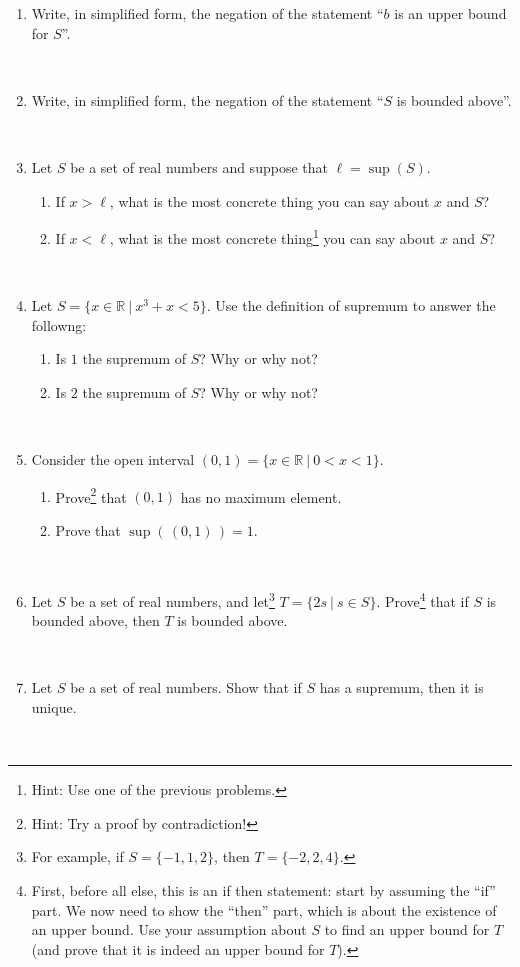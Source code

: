 \documentclass[12pt]{amsart}
\newcommand{\R}{\mathbb{R}}
\begin{document}
\begin{enumerate}
\item Write, in simplified form, the negation of the statement ``$b$ is an upper bound for $S$''.

\

\item\label{2} Write, in simplified form, the negation of the statement ``$S$ is bounded above''.

\

\item Let $S$ be a set of real numbers and suppose that $\ell=\sup(S)$. 
\begin{enumerate}
\item If $x > \ell$, what is the most concrete thing you can say about $x$ and $S$?
\item If $x < \ell$, what is the most concrete thing\footnote{Hint: Use one of the previous problems.} you can say about $x$ and $S$?
\end{enumerate}

\

\item Let $S=\{x\in \R \ | \ x^3 + x < 5\}$. Use the definition of supremum to answer the followng:
\begin{enumerate}
\item Is $1$ the supremum of $S$? Why or why not?
\item Is $2$ the supremum of $S$? Why or why not?
\end{enumerate}

\

\item Consider the open interval $(0,1) = \{ x\in \R \ | \ 0 < x < 1\}$. 
\begin{enumerate}
\item Prove\footnote{Hint: Try a proof by contradiction!} that $(0,1)$ has no maximum element.
\item Prove that $\sup(\, (0,1) \, ) = 1$.
\end{enumerate}


\

\item\label{4} Let $S$ be a set of real numbers, and let\footnote{For example, if $S= \{-1,1,2\}$, then $T=\{-2,2,4\}$.} $T=\{ 2s \ | \ s\in S\}$. Prove\footnote{First, before all else, this is an if then statement: start by assuming the ``if'' part. We now need to show the ``then'' part, which is about the existence of an upper bound. Use your assumption about $S$ to find an upper bound for $T$ (and prove that it is indeed an upper bound for $T$).} that if $S$ is bounded above, then $T$ is bounded above.

\

\item Let $S$ be a set of real numbers. Show that if $S$ has a supremum, then it is unique.

\

\end{enumerate}
\end{document}
